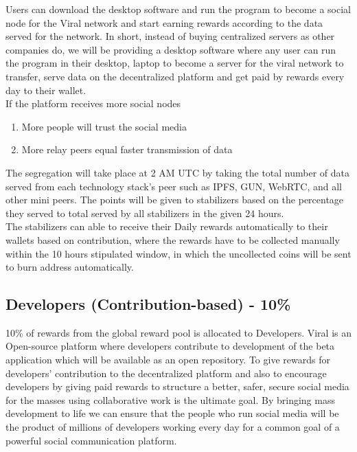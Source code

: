\documentclass[10pt]{article}
\begin{document}
Users can download the desktop software and run the program to become a social node for the Viral network and start earning rewards according to the data served for the network. In short, instead of buying centralized servers as other companies do, we will be providing a desktop software where any user can run the program in their desktop, laptop to become a server for the viral network to transfer, serve data on the decentralized platform and get paid by rewards every day to their wallet.\\

If the platform receives more social nodes\\
\begin{enumerate}[leftmargin=+0.2in]
\item More people will trust the social media
\item More relay peers equal faster transmission of data
\end{enumerate}


The segregation will take place at 2 AM UTC by taking the total number of data served from each technology stack's peer such as IPFS, GUN, WebRTC, and all other mini peers. The points will be given to stabilizers based on the percentage they served to total served by all stabilizers in the given 24 hours. \\

The stabilizers can able to receive their Daily rewards automatically to their wallets based on contribution, where the rewards have to be collected manually within the 10 hours stipulated window, in which the uncollected coins will be sent to burn address automatically.\\


\subsection{Developers (Contribution-based) - 10\%}

10\% of rewards from the global reward pool is allocated to Developers. Viral is an Open-source platform where developers contribute to development of the beta application which will be available as an open repository. To give rewards for developers' contribution to the decentralized platform and also to encourage developers by giving paid rewards to structure a better, safer, secure social media for the masses using collaborative work is the ultimate goal. By bringing mass development to life we can ensure that the people who run social media will be the product of millions of developers working every day for a common goal of a powerful social communication platform.\\
\end{document}
